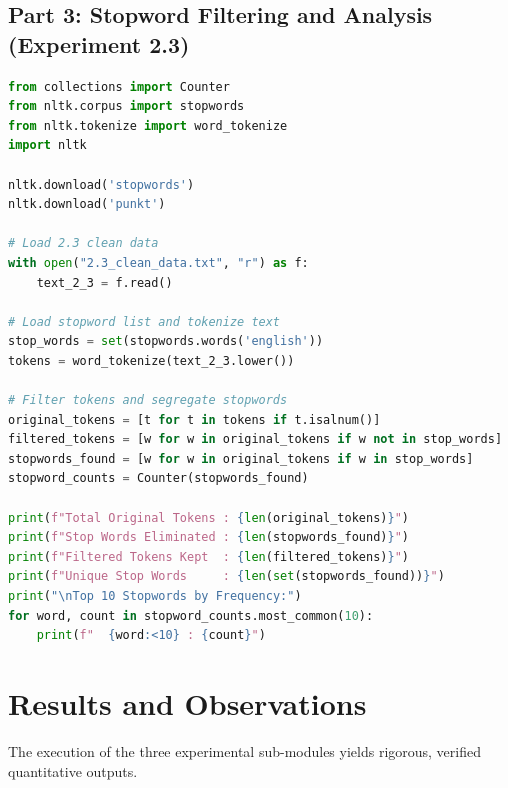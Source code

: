 \subsection{Part 3: Stopword Filtering and Analysis (Experiment 2.3)}
\begin{lstlisting}[language=Python, caption={Experiment 2.3: Tokenization and Stopword Removal}]
from collections import Counter
from nltk.corpus import stopwords
from nltk.tokenize import word_tokenize
import nltk

nltk.download('stopwords')
nltk.download('punkt')

# Load 2.3 clean data
with open("2.3_clean_data.txt", "r") as f:
    text_2_3 = f.read()

# Load stopword list and tokenize text
stop_words = set(stopwords.words('english'))
tokens = word_tokenize(text_2_3.lower())

# Filter tokens and segregate stopwords
original_tokens = [t for t in tokens if t.isalnum()]
filtered_tokens = [w for w in original_tokens if w not in stop_words]
stopwords_found = [w for w in original_tokens if w in stop_words]
stopword_counts = Counter(stopwords_found)

print(f"Total Original Tokens : {len(original_tokens)}")
print(f"Stop Words Eliminated : {len(stopwords_found)}")
print(f"Filtered Tokens Kept  : {len(filtered_tokens)}")
print(f"Unique Stop Words     : {len(set(stopwords_found))}")
print("\nTop 10 Stopwords by Frequency:")
for word, count in stopword_counts.most_common(10):
    print(f"  {word:<10} : {count}")
\end{lstlisting}

\section{Results and Observations}
The execution of the three experimental sub-modules yields rigorous, verified quantitative outputs.

